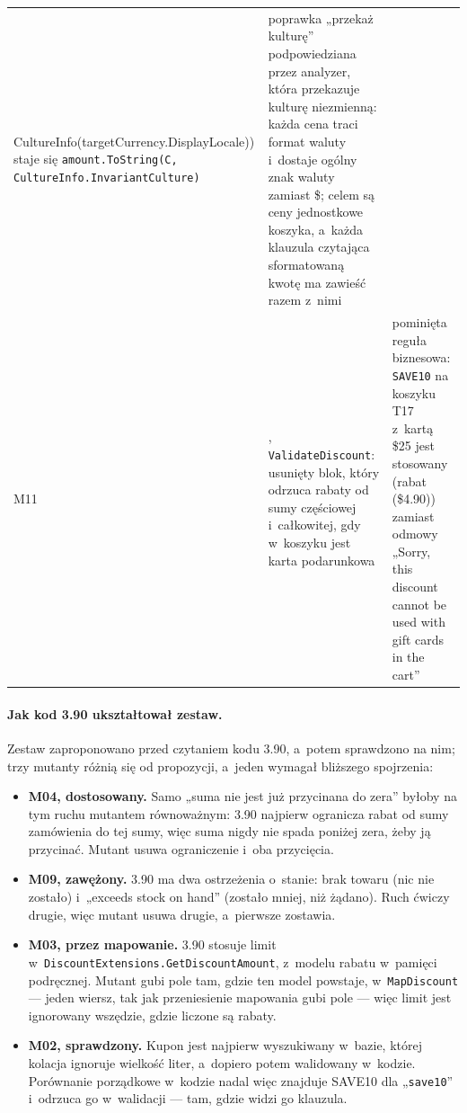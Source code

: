 {\begin{xltabular}{\linewidth}{@{}l >{\raggedright\arraybackslash}X >{\raggedright\arraybackslash}X@{}}
{  CultureInfo(\allowbreak{}targetCurrency.DisplayLocale))} staje się
  \texttt{amount.ToString(\textquotedbl{}C\textquotedbl{}, CultureInfo.\allowbreak{}InvariantCulture)} & poprawka
  „przekaż kulturę” podpowiedziana przez analyzer, która przekazuje kulturę niezmienną: każda
  cena traci format waluty i~dostaje ogólny znak waluty zamiast \$; celem są ceny
  jednostkowe koszyka, a~każda klauzula czytająca sformatowaną kwotę ma zawieść razem
  z~nimi \\
M11 & ,
  \texttt{ValidateDiscount}: usunięty blok, który odrzuca rabaty od sumy częściowej
  i~całkowitej, gdy w~koszyku jest karta podarunkowa & pominięta reguła biznesowa:
  \texttt{SAVE10} na koszyku T17 z~kartą \$25 jest stosowany (rabat (\$4.90)) zamiast odmowy
  „Sorry, this discount cannot be used with gift cards in the cart” \\
\end{xltabular}
}

\paragraph{Jak kod 3.90 ukształtował zestaw.} Zestaw zaproponowano przed czytaniem kodu 3.90,
a~potem sprawdzono na nim; trzy mutanty różnią się od propozycji, a~jeden wymagał bliższego
spojrzenia:
\begin{itemize}
  \item \textbf{M04, dostosowany.} Samo „suma nie jest już przycinana do zera” byłoby na tym
    ruchu mutantem równoważnym: 3.90 najpierw ogranicza rabat od sumy zamówienia do tej sumy,
    więc suma nigdy nie spada poniżej zera, żeby ją przycinać. Mutant usuwa ograniczenie
    i~oba przycięcia.
  \item \textbf{M09, zawężony.} 3.90 ma dwa ostrzeżenia o~stanie: brak towaru (nic nie zostało)
    i~„exceeds stock on hand” (zostało mniej, niż żądano). Ruch ćwiczy drugie, więc mutant
    usuwa drugie, a~pierwsze zostawia.
  \item \textbf{M03, przez mapowanie.} 3.90 stosuje limit
    w~\texttt{DiscountExtensions.GetDiscountAmount}, z~modelu rabatu w~pamięci podręcznej.
    Mutant gubi pole tam, gdzie ten model powstaje, w~\texttt{MapDiscount} --- jeden wiersz,
    tak jak przeniesienie mapowania gubi pole --- więc limit jest ignorowany wszędzie, gdzie
    liczone są rabaty.
  \item \textbf{M02, sprawdzony.} Kupon jest najpierw wyszukiwany w~bazie, której kolacja
    ignoruje wielkość liter, a~dopiero potem walidowany w~kodzie. Porównanie porządkowe
    w~kodzie nadal więc znajduje SAVE10 dla
    „\texttt{\textvisiblespace{}save10\textvisiblespace{}}” i~odrzuca go w~walidacji ---
    tam, gdzie widzi go klauzula.
\end{itemize}

